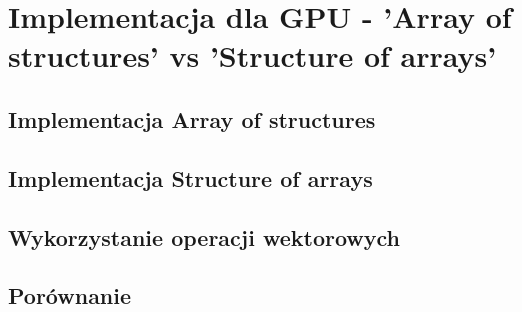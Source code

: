 
\section { Implementacja dla GPU - 'Array of structures' vs 'Structure of arrays' }
\subsection { Implementacja Array of structures }
\subsection { Implementacja Structure of arrays }
\subsection {Wykorzystanie operacji wektorowych}
\subsection { Porównanie }
